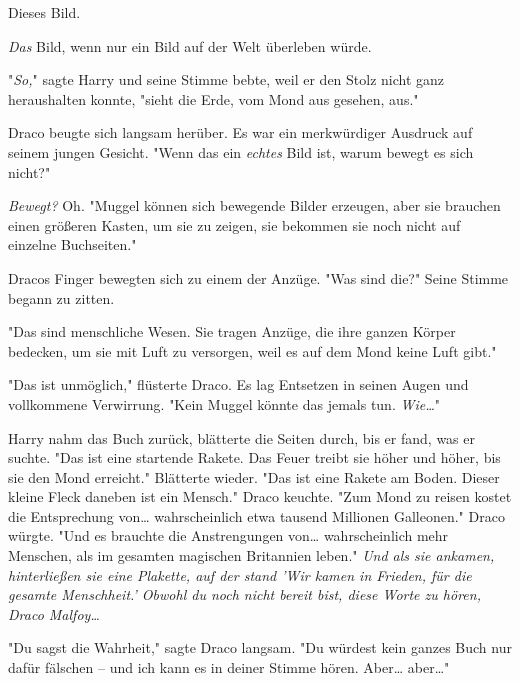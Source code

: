 {Dieses Bild.

\emph{Das} Bild, wenn nur ein Bild auf der Welt überleben würde.

"\emph{So,}" sagte Harry und seine Stimme bebte, weil er den Stolz nicht ganz heraushalten konnte, "sieht die Erde, vom Mond aus gesehen, aus."

Draco beugte sich langsam herüber. Es war ein merkwürdiger Ausdruck auf seinem jungen Gesicht. "Wenn das ein \emph{echtes} Bild ist, warum bewegt es sich nicht?"

\emph{Bewegt?} Oh. "Muggel können sich bewegende Bilder erzeugen, aber sie brauchen einen größeren Kasten, um sie zu zeigen, sie bekommen sie noch nicht auf einzelne Buchseiten."

Dracos Finger bewegten sich zu einem der Anzüge. "Was sind die?" Seine Stimme begann zu zitten.

"Das sind menschliche Wesen. Sie tragen Anzüge, die ihre ganzen Körper bedecken, um sie mit Luft zu versorgen, weil es auf dem Mond keine Luft gibt."

"Das ist unmöglich," flüsterte Draco. Es lag Entsetzen in seinen Augen und vollkommene Verwirrung. "Kein Muggel könnte das jemals tun. \emph{Wie…}"

Harry nahm das Buch zurück, blätterte die Seiten durch, bis er fand, was er suchte. "Das ist eine startende Rakete. Das Feuer treibt sie höher und höher, bis sie den Mond erreicht." Blätterte wieder. "Das ist eine Rakete am Boden. Dieser kleine Fleck daneben ist ein Mensch." Draco keuchte. "Zum Mond zu reisen kostet die Entsprechung von… wahrscheinlich etwa tausend Millionen Galleonen." Draco würgte. "Und es brauchte die Anstrengungen von… wahrscheinlich mehr Menschen, als im gesamten magischen Britannien leben." \emph{Und als sie ankamen, hinterließen sie eine Plakette, auf der stand 'Wir kamen in Frieden, für die gesamte Menschheit.' Obwohl du noch nicht bereit bist, diese Worte zu hören, Draco Malfoy…}

"Du sagst die Wahrheit," sagte Draco langsam. "Du würdest kein ganzes Buch nur dafür fälschen -- und ich kann es in deiner Stimme hören. Aber… aber…"

}
